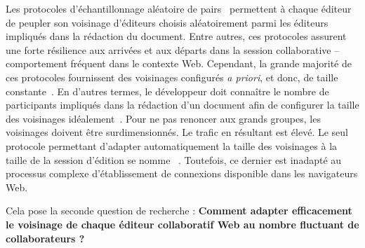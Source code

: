 Les protocoles d'échantillonnage aléatoire de pairs~\cite{jelasity2007gossip}
permettent à chaque éditeur de peupler son voisinage d'éditeurs choisis
aléatoirement parmi les éditeurs impliqués dans la rédaction du document. Entre
autres, ces protocoles assurent une forte résilience aux arrivées et aux départs
dans la session collaborative -- comportement fréquent dans le contexte
Web. Cependant, la grande majorité de ces protocoles fournissent des voisinages
configurés \emph{a priori}, et donc, de taille
constante~\cite{eugster2003lightweight, jelasity2007gossip,
  leitao2007dependable, tolgyeski2009adaptive, voulgaris2005cyclon}. En d'autres
termes, le développeur doit connaître le nombre de participants impliqués dans
la rédaction d'un document afin de configurer la taille des voisinages
idéalement~\cite{erdos1959random}.  Pour ne pas renoncer aux grands groupes, les
voisinages doivent être surdimensionnés. Le trafic en résultant est élevé. Le
seul protocole permettant d'adapter automatiquement la taille des voisinages à
la taille de la session d'édition se nomme
\SCAMP~\cite{ganesh2003peer}. Toutefois, ce dernier est inadapté au processus
complexe d'établissement de connexions disponible dans les navigateurs Web.


Cela pose la seconde question de recherche : \textbf{Comment adapter
  efficacement le voisinage de chaque éditeur collaboratif Web au nombre
  fluctuant de collaborateurs ?}


